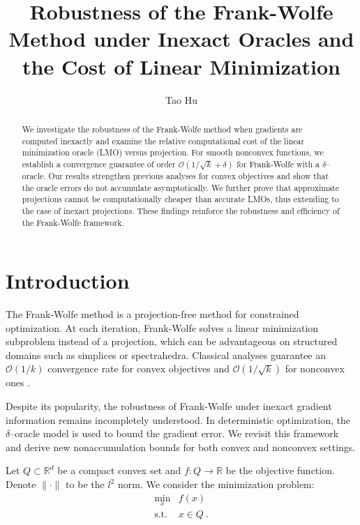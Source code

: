 \documentclass[smallextended]{svjour3}
\title{Robustness of the Frank-Wolfe Method under Inexact Oracles and the Cost of Linear Minimization}
\author{Tao Hu    
}
\institute{Tao Hu \at
              School of Mathematics and Statistics, Xi'an Jiaotong University, Xi'an, Shaanxi 710049, P.R. China \\ \email{hu\_tao@stu.xjtu.edu.cn} 
}
\date{}
\newcommand{\RR}{\mathbb{R}}
\begin{document}
\maketitle

\begin{abstract}
We investigate the robustness of the Frank-Wolfe method when gradients are computed inexactly and examine the relative computational cost of the linear minimization oracle (LMO) versus projection. For smooth nonconvex functions, we establish a convergence guarantee of order $\mathcal{O}(1/\sqrt{k}+\delta)$ for Frank-Wolfe with a $\delta$--oracle. Our results strengthen previous analyses for convex objectives and show that the oracle errors do not accumulate asymptotically. We further prove that approximate projections cannot be computationally cheaper than accurate LMOs, thus extending to the case of inexact projections. These findings reinforce the robustness and efficiency of the Frank-Wolfe framework.
\end{abstract}

\section{Introduction}\label{sec:intro}
The Frank-Wolfe method is a projection-free method for constrained optimization.
At each iteration, Frank-Wolfe solves a linear minimization subproblem instead of a projection, which can be advantageous on structured domains such as simplices or spectrahedra. Classical analyses guarantee an $\mathcal{O}(1/k)$ convergence rate for convex objectives \cite{Jaggi2013,FreundGrigas2013} and $\mathcal{O}(1/\sqrt{k})$ for nonconvex ones \cite{lacostejulien2016convergenceratefrankwolfenonconvex}.

Despite its popularity, the robustness of Frank-Wolfe under inexact gradient information remains incompletely understood. In deterministic optimization, the $\delta$--oracle model \cite{Devolder2014} is used to bound the gradient error. We revisit this framework and derive new nonaccumulation bounds for both convex and nonconvex settings.



Let $Q\subset\RR^d$ be a compact convex set and $f:Q\to\RR$ be the objective function. Denote $\|\cdot\|$ to be the $l^2$ norm. We consider the minimization problem:\begin{equation*}
\label{poi3}\begin{array}{rl}\min\limits_{ x} & f( x) \\
\mathrm{s.t.} &  x \in Q \ . \end{array}
\end{equation*} 
\end{document}
